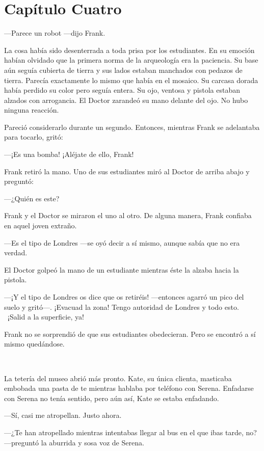\chapter*{Capítulo Cuatro}

---Parece un robot ---dijo Frank.

La cosa había sido desenterrada a toda prisa por los estudiantes. En su
emoción habían olvidado que la primera norma de la arqueología era la
paciencia. Su base aún seguía cubierta de tierra y sus lados estaban
manchados con pedazos de tierra. Parecía exactamente lo mismo que había
en el mosaico. Su carcasa dorada había perdido su color pero seguía
entera. Su ojo, ventosa y pistola estaban alzados con arrogancia. El
Doctor zarandeó su mano delante del ojo. No hubo ninguna reacción.

Pareció considerarlo durante un segundo. Entonces, mientras Frank se
adelantaba para tocarlo, gritó:

---¡Es una bomba! ¡Aléjate de ello, Frank!

Frank retiró la mano. Uno de sus estudiantes miró al Doctor de arriba
abajo y preguntó:

---¿Quién es este?

Frank y el Doctor se miraron el uno al otro. De alguna manera, Frank
confiaba en aquel joven extraño.

---Es el tipo de Londres ---se oyó decir a sí mismo, aunque sabía que no
era verdad.

El Doctor golpeó la mano de un estudiante mientras éste la alzaba hacia
la pistola.

---¡Y el tipo de Londres os dice que os retiréis! ---entonces agarró un
pico del suelo y gritó---. ¡Evacuad la zona! Tengo autoridad de Londres
y todo esto. ~¡Salid a la superficie, ya!

Frank no se sorprendió de que sus estudiantes obedecieran. Pero se
encontró a sí mismo quedándose.

~

La tetería del museo abrió más pronto. Kate, su única clienta, masticaba
embobada una pasta de te mientras hablaba por teléfono con Serena.
Enfadarse con Serena no tenía sentido, pero aún así, Kate se estaba
enfadando.

---Sí, casi me atropellan. Justo ahora.

---¿Te han atropellado mientras intentabas llegar al bus en el que ibas
tarde, no? ---preguntó la aburrida y sosa voz de Serena.

